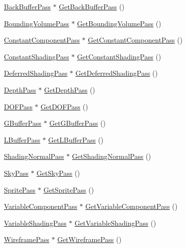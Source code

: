 \begin{DoxyCompactItemize}
\item 
\hyperlink{classmage_1_1_back_buffer_pass}{Back\+Buffer\+Pass} $\ast$ \hyperlink{classmage_1_1_renderer_a94e08d62790b3bfb1a12ae2ae657c5c2}{Get\+Back\+Buffer\+Pass} ()
\item 
\hyperlink{classmage_1_1_bounding_volume_pass}{Bounding\+Volume\+Pass} $\ast$ \hyperlink{classmage_1_1_renderer_a770922853ea48d3f01be5518df8aadb5}{Get\+Bounding\+Volume\+Pass} ()
\item 
\hyperlink{classmage_1_1_constant_component_pass}{Constant\+Component\+Pass} $\ast$ \hyperlink{classmage_1_1_renderer_ae0299628a5475fb8587186a4cacc6a75}{Get\+Constant\+Component\+Pass} ()
\item 
\hyperlink{classmage_1_1_constant_shading_pass}{Constant\+Shading\+Pass} $\ast$ \hyperlink{classmage_1_1_renderer_a190ca65f3a88e4c4e607e0909674a9d9}{Get\+Constant\+Shading\+Pass} ()
\item 
\hyperlink{classmage_1_1_deferred_shading_pass}{Deferred\+Shading\+Pass} $\ast$ \hyperlink{classmage_1_1_renderer_af678bc2be0c501375b448fc95adad131}{Get\+Deferred\+Shading\+Pass} ()
\item 
\hyperlink{classmage_1_1_depth_pass}{Depth\+Pass} $\ast$ \hyperlink{classmage_1_1_renderer_ad73ac769e45eeeb9d293b019be996936}{Get\+Depth\+Pass} ()
\item 
\hyperlink{classmage_1_1_d_o_f_pass}{D\+O\+F\+Pass} $\ast$ \hyperlink{classmage_1_1_renderer_aecc4a5b2b6978ca03796f078c3936423}{Get\+D\+O\+F\+Pass} ()
\item 
\hyperlink{classmage_1_1_g_buffer_pass}{G\+Buffer\+Pass} $\ast$ \hyperlink{classmage_1_1_renderer_a65fbd3dddaf1bff3fc9f53e00c38bb62}{Get\+G\+Buffer\+Pass} ()
\item 
\hyperlink{structmage_1_1_l_buffer_pass}{L\+Buffer\+Pass} $\ast$ \hyperlink{classmage_1_1_renderer_a6b43c7342a017282e5f9f14ac581ea2b}{Get\+L\+Buffer\+Pass} ()
\item 
\hyperlink{classmage_1_1_shading_normal_pass}{Shading\+Normal\+Pass} $\ast$ \hyperlink{classmage_1_1_renderer_a57e18039593423628715375e7a1b1163}{Get\+Shading\+Normal\+Pass} ()
\item 
\hyperlink{classmage_1_1_sky_pass}{Sky\+Pass} $\ast$ \hyperlink{classmage_1_1_renderer_ad81ae84e11337dc699d4c6fb2d367e4d}{Get\+Sky\+Pass} ()
\item 
\hyperlink{classmage_1_1_sprite_pass}{Sprite\+Pass} $\ast$ \hyperlink{classmage_1_1_renderer_ada671ebf46487d88c326657a43184117}{Get\+Sprite\+Pass} ()
\item 
\hyperlink{classmage_1_1_variable_component_pass}{Variable\+Component\+Pass} $\ast$ \hyperlink{classmage_1_1_renderer_abc9ee209c84f87d3186b4390162b9be1}{Get\+Variable\+Component\+Pass} ()
\item 
\hyperlink{classmage_1_1_variable_shading_pass}{Variable\+Shading\+Pass} $\ast$ \hyperlink{classmage_1_1_renderer_aaea6458a480c62f8b0b911f16e5058b9}{Get\+Variable\+Shading\+Pass} ()
\item 
\hyperlink{classmage_1_1_wireframe_pass}{Wireframe\+Pass} $\ast$ \hyperlink{classmage_1_1_renderer_a8069fab64b56b69dca3d9a8a5ebc3f8e}{Get\+Wireframe\+Pass} ()
\end{DoxyCompactItemize}
